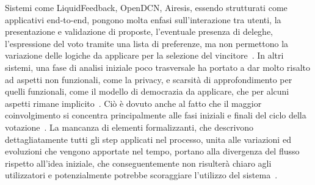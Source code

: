 \documentclass[12pt,a4paper,openright,twoside]{book}
\begin{document}
Sistemi come LiquidFeedback, OpenDCN, Airesis, essendo strutturati come applicativi end-to-end,
pongono molta enfasi sull'interazione tra utenti, la presentazione e validazione di proposte,
l'eventuale presenza di deleghe, l'espressione del voto tramite una lista di preferenze, ma
non permettono la variazione delle logiche da applicare per la selezione del vincitore~\cite{Trapanese:2018}.
In altri sistemi, una fase di analisi iniziale poco trasversale ha portato a dar molto risalto
ad aspetti non funzionali, come la privacy, e scarsità di approfondimento per quelli funzionali, come il modello di democrazia
da applicare, che per alcuni aspetti rimane implicito~\cite{Pianini:2019}.
Ciò è dovuto anche al fatto che il maggior coinvolgimento si concentra 
principalmente alle fasi iniziali e finali del ciclo della votazione~\cite{hennen2020european}.
La mancanza di elementi formalizzanti, che descrivono dettagliatamente tutti gli step applicati nel
processo, unita alle variazioni ed evoluzioni che vengono apportate nel tempo, portano alla divergenza del flusso rispetto all'idea iniziale, 
che conseguentemente non risulterà chiaro agli utilizzatori e potenzialmente potrebbe scoraggiare l'utilizzo del sistema~\cite{Pianini:2019}.
\end{document}
